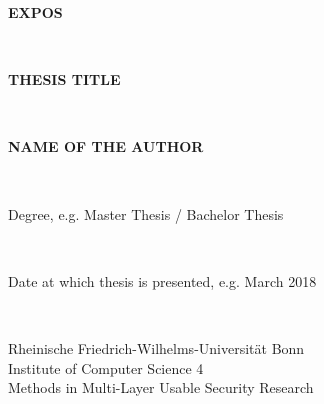 \begin{titlepage}
\begin{Large}
\begin{flushleft}
\end{flushleft} 
\end{Large}
\vspace{6,5em}

\begin{center}
\color{RoyalBlue}
 \begin{Large}
 	\textbf{EXPOS}\end{Large}\\
 \vspace{0.02\textheight}
 \begin{Large}
 	\textbf{THESIS TITLE}\end{Large}\\
 \vspace{0.02\textheight}
 \color{black}
 \begin{large} \textbf{NAME OF THE AUTHOR}\end{large}\\
  \vspace{12,5em}
 \begin{normalsize}{Degree, e.g. Master Thesis / Bachelor Thesis}\end{normalsize}\\
 \vspace{0,5em}
 \begin{normalsize}{Date at which thesis is presented, e.g. March 2018}\end{normalsize}\\
\end{center}
\vspace{10,5em}

\begin{normalsize}
\begin{center}
Rheinische Friedrich-Wilhelms-Universität Bonn \\
Institute of Computer Science 4 \\
Methods in Multi-Layer Usable Security Research
\end{center} 
\end{normalsize}
\end{titlepage}